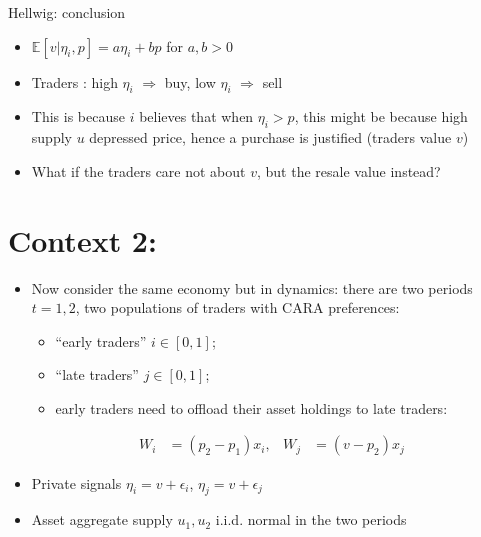 \documentclass[english,10pt
,aspectratio=169
]{beamer}
\begin{document}
\begin{frame}{Hellwig: conclusion}
	\begin{itemize}
		\item $\mathbb{E} \left[ v | \eta_i, p\right] = a \eta_i + b p$ for $a,b>0$
		\item Traders : high $\eta_i$ $\Rightarrow$ buy, low $\eta_i$ $\Rightarrow$ sell
		\item This is because $i$ believes that when $\eta_i > p$, this might be because high supply $u$ depressed price, hence a purchase is justified (traders  value $v$)
		\pause
		\item What if the traders care not about $v$, but the resale value instead?
	\end{itemize}
\end{frame}



\section{Context 2: \cite{brown_technical_1989}}

\begin{frame}{\cite{brown_technical_1989}}
	\begin{itemize}
		\item Now consider the same economy but in dynamics: there are two periods $t=1,2$, two populations of traders with CARA preferences:
		\begin{itemize}
			\item ``early traders'' $i \in [0,1]$;
			\item ``late traders'' $j \in [0,1]$;
			\item early traders need to offload their asset holdings to late traders:
		\end{itemize}
		\begin{align*}
			W_i & = (p_2 - p_1) x_i, &
			W_j & = (v - p_2) x_j
		\end{align*}
		\item Private signals $\eta_i = v + \epsilon_i$, $\eta_j = v + \epsilon_j$
		\item Asset aggregate supply $u_1,u_2$ i.i.d. normal in the two periods
	\end{itemize}
\end{frame}
\end{document}
